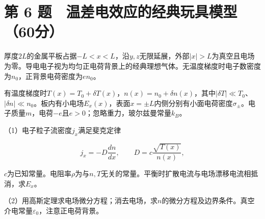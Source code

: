 \documentclass[12pt,a4paper,fontset=fandol]{ctexart}
\begin{document}
\section{第 6
题　温差电效应的经典玩具模型（60分）}\label{ux7b2c-6-ux9898-ux6e29ux5deeux7535ux6548ux5e94ux7684ux7ecfux5178ux73a9ux5177ux6a21ux578b60ux5206}

厚度\(2L\)的金属平板占据\(-L<x<L\)，沿\(y,z\)无限延展，外部\(|x|>L\)为真空且电场为零。导电电子视为均匀正电荷背景上的经典理想气体。无温度梯度时电子数密度为\(n_0\)，正背景电荷密度为\(en_0\)。

有温度梯度时\(T(x)=T_0+\delta T(x)\)，\(n(x)=n_0+\delta n(x)\)，其中\(|\delta T|\ll T_0\)、\(|\delta n|\ll n_0\)。板内有小电场\(E_x(x)\)，表面\(x=\pm L\)内侧分别有小面电荷密度\(\sigma_\pm\)。电子质量\(m\)，电荷\(-e\)且\(e>0\)；忽略重力，玻尔兹曼常量\(k_B\)。

\begin{center}
\begin{minipage}{\linewidth}
\centering\begingroup{}
\ifdim\wd\diagrambox>.88\linewidth
\sbox{\diagrambox}{\resizebox{.88\linewidth}{!}{\usebox{\diagrambox}}}\fi
\ifdim\ht\diagrambox>.38\textheight
\resizebox{!}{.38\textheight}{\usebox{\diagrambox}}
\else\usebox{\diagrambox}\fi
\par{}\endgroup\end{minipage}\end{center}

（1）电子粒子流密度\(j_x\)满足斐克定律

\[
j_x=-D\frac{dn}{dx},\qquad
D=c\frac{\sqrt{T(x)}}{n(x)},
\]

\(c\)为已知常量。电阻率\(\rho\)为与\(n,T\)无关的常量。平衡时扩散电流与电场漂移电流相抵消，求\(E_x\)。

（2）用高斯定理求电场微分方程；消去电场，求\(n\)的微分方程及边界条件。真空介电常量\(\varepsilon_0\)，注意正电荷背景。
\end{document}
